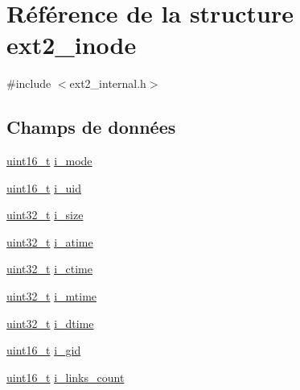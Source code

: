 \hypertarget{structext2__inode}{\section{Référence de la structure ext2\+\_\+inode}
\label{structext2__inode}
}


{\ttfamily \#include $<$ext2\+\_\+internal.\+h$>$}

\subsection*{Champs de données}
\begin{DoxyCompactItemize}
\item 
\hyperlink{kernel_2include_2types_8h_adf4d876453337156dde61095e1f20223}{uint16\+\_\+t} \hyperlink{structext2__inode_ab18d6b6ddb4d36a2faff527b43241126}{i\+\_\+mode}
\item 
\hyperlink{kernel_2include_2types_8h_adf4d876453337156dde61095e1f20223}{uint16\+\_\+t} \hyperlink{structext2__inode_a082def4b3c1c0c5f9dce1eab8ba51189}{i\+\_\+uid}
\item 
\hyperlink{kernel_2include_2types_8h_a33594304e786b158f3fb30289278f5af}{uint32\+\_\+t} \hyperlink{structext2__inode_a2b9e2a1c732aa02b5dead0948fb47c72}{i\+\_\+size}
\item 
\hyperlink{kernel_2include_2types_8h_a33594304e786b158f3fb30289278f5af}{uint32\+\_\+t} \hyperlink{structext2__inode_adb682923fb8b418217d78fd78737406b}{i\+\_\+atime}
\item 
\hyperlink{kernel_2include_2types_8h_a33594304e786b158f3fb30289278f5af}{uint32\+\_\+t} \hyperlink{structext2__inode_a7d45cc039be5128d9771412191e55544}{i\+\_\+ctime}
\item 
\hyperlink{kernel_2include_2types_8h_a33594304e786b158f3fb30289278f5af}{uint32\+\_\+t} \hyperlink{structext2__inode_a7eb44698eabf570fee0e65d22cc5fbd1}{i\+\_\+mtime}
\item 
\hyperlink{kernel_2include_2types_8h_a33594304e786b158f3fb30289278f5af}{uint32\+\_\+t} \hyperlink{structext2__inode_a2a30cea7fb676d2fa5e9f0bd799dfa7c}{i\+\_\+dtime}
\item 
\hyperlink{kernel_2include_2types_8h_adf4d876453337156dde61095e1f20223}{uint16\+\_\+t} \hyperlink{structext2__inode_af1686b705ca7912d370d12ceaab83b8b}{i\+\_\+gid}
\item 
\hyperlink{kernel_2include_2types_8h_adf4d876453337156dde61095e1f20223}{uint16\+\_\+t} \hyperlink{structext2__inode_aa6d7753ffe6e8634bafe0b55638ee29a}{i\+\_\+links\+\_\+count}

\end{DoxyCompactItemize}
